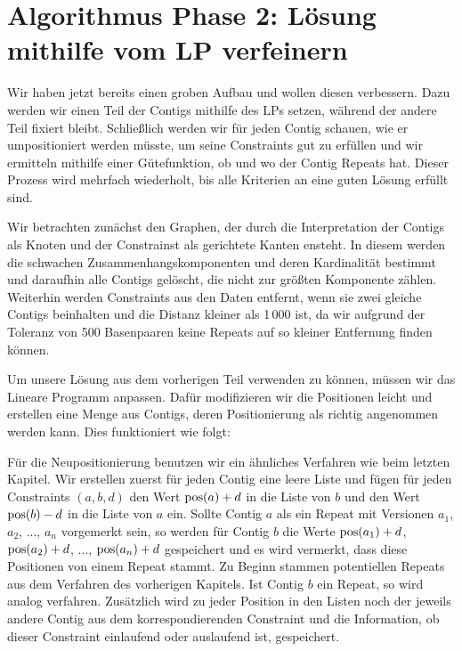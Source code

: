 \section{Algorithmus Phase 2: Lösung mithilfe vom LP verfeinern}
Wir haben jetzt bereits einen groben Aufbau und wollen diesen verbessern. Dazu werden wir einen Teil der Contigs mithilfe des LPs setzen, während der andere Teil fixiert bleibt. Schließlich werden wir für jeden Contig schauen, wie er umpositioniert werden müsste, um seine Constraints gut zu erfüllen und wir ermitteln mithilfe einer Gütefunktion, ob und wo der Contig Repeats hat. Dieser Prozess wird mehrfach wiederholt, bis alle Kriterien an eine guten Lösung erfüllt sind.

Wir betrachten zunächst den Graphen, der durch die Interpretation der Contigs als Knoten und der Constrainst als gerichtete Kanten ensteht. In diesem werden die schwachen Zusammenhangskomponenten und deren Kardinalität bestimmt und daraufhin alle Contigs gelöscht, die nicht zur größten Komponente zählen.
Weiterhin werden Constraints aus den Daten entfernt, wenn sie zwei gleiche Contigs beinhalten und die Distanz kleiner als 1\,000 ist, da wir aufgrund der Toleranz von 500 Basenpaaren keine Repeats auf so kleiner Entfernung finden können.

Um unsere Lösung aus dem vorherigen Teil verwenden zu können, müssen wir das Lineare Programm anpassen. Dafür modifizieren wir die Positionen leicht und erstellen eine Menge aus Contigs, deren Positionierung als richtig angenommen werden kann. Dies funktioniert wie folgt:


Für die Neupositionierung benutzen wir ein ähnliches Verfahren wie beim letzten Kapitel. Wir erstellen zuerst für jeden Contig eine leere Liste
und fügen für jeden Constraints $(a,b,d)$ den Wert $\operatorname*{pos}(a)+d$ in die Liste von $b$ und den Wert $\operatorname*{pos}(b)-d$ in die Liste von $a$ ein. Sollte Contig $a$ als ein Repeat mit Versionen $a_1$, $a_2$, ..., $a_n$ vorgemerkt sein, so werden für Contig $b$ die Werte $\operatorname*{pos}(a_1)+d$, $\operatorname*{pos}(a_2)+d$, ..., $\operatorname*{pos}(a_n)+d$ gespeichert und es wird vermerkt, dass diese Positionen von einem Repeat stammt. 
Zu Beginn stammen potentiellen Repeats aus dem Verfahren des vorherigen Kapitels. 
Ist Contig $b$ ein Repeat, so wird analog verfahren.
Zusätzlich wird zu jeder Position in den Listen noch der jeweils andere Contig aus dem korrespondierenden Constraint und die Information, ob dieser Constraint einlaufend oder auslaufend ist, gespeichert.

